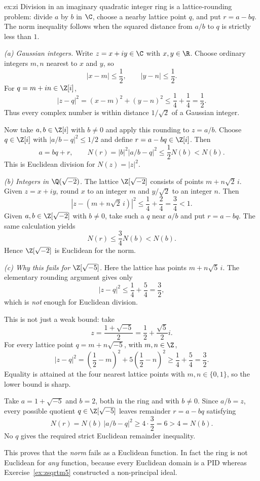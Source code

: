 \begin{solution}{ex:zi}
\idea Division in an imaginary quadratic integer ring is a lattice-rounding problem: divide $a$ by $b$ in $\C$, choose a nearby lattice point $q$, and put $r=a-bq$. The norm inequality follows when the squared distance from $a/b$ to $q$ is strictly less than $1$.

\writeup \emph{(a) Gaussian integers.} Write $z=x+iy\in\C$ with $x,y\in\R$. Choose ordinary integers $m,n$ nearest to $x$ and $y$, so
\[
|x-m|\le\frac12,\qquad |y-n|\le\frac12.
\]
For $q=m+in\in\Z[i]$,
\[
|z-q|^2=(x-m)^2+(y-n)^2\le\frac14+\frac14=\frac12.
\]
Thus every complex number is within distance $1/\sqrt2$ of a Gaussian integer.

Now take $a,b\in\Z[i]$ with $b\ne0$ and apply this rounding to $z=a/b$. Choose $q\in\Z[i]$ with $|a/b-q|^2\le1/2$ and define $r=a-bq\in\Z[i]$. Then
\[
a=bq+r,\qquad
N(r)=|b|^2|a/b-q|^2\le\frac12N(b)<N(b).
\]
This is Euclidean division for $N(z)=|z|^2$.

\emph{(b) Integers in $\Q(\sqrt{-2})$.} The lattice $\Z[\sqrt{-2}]$ consists of points $m+n\sqrt2\,i$. Given $z=x+iy$, round $x$ to an integer $m$ and $y/\sqrt2$ to an integer $n$. Then
\[
|z-(m+n\sqrt2\,i)|^2
\le\frac14+\frac{2}{4}=\frac34<1.
\]
Given $a,b\in\Z[\sqrt{-2}]$ with $b\ne0$, take such a $q$ near $a/b$ and put $r=a-bq$. The same calculation yields
\[
N(r)\le\frac34 N(b)<N(b).
\]
Hence $\Z[\sqrt{-2}]$ is Euclidean for the norm.

\emph{(c) Why this fails for $\Z[\sqrt{-5}]$.} Here the lattice has points $m+n\sqrt5\,i$. The elementary rounding argument gives only
\[
|z-q|^2\le\frac14+\frac54=\frac32,
\]
which is \emph{not} enough for Euclidean division.

This is not just a weak bound: take
\[
z=\frac{1+\sqrt{-5}}2=\frac12+\frac{\sqrt5}{2}i.
\]
For every lattice point $q=m+n\sqrt{-5}$, with $m,n\in\Z$,
\[
|z-q|^2
=\left(\frac12-m\right)^2
 +5\left(\frac12-n\right)^2
\ge\frac14+\frac54=\frac32.
\]
Equality is attained at the four nearest lattice points with $m,n\in\{0,1\}$, so the lower bound is sharp.

Take $a=1+\sqrt{-5}$ and $b=2$, both in the ring and with $b\ne0$. Since $a/b=z$, every possible quotient $q\in\Z[\sqrt{-5}]$ leaves remainder $r=a-bq$ satisfying
\[
N(r)=N(b)\,|a/b-q|^2
\ge4\cdot\frac32=6>4=N(b).
\]
No $q$ gives the required strict Euclidean remainder inequality.

This proves that the \emph{norm} fails as a Euclidean function. In fact the ring is not Euclidean for \emph{any} function, because every Euclidean domain is a PID whereas Exercise~\ref{ex:zsqrtm5} constructed a non-principal ideal.
\end{solution}

